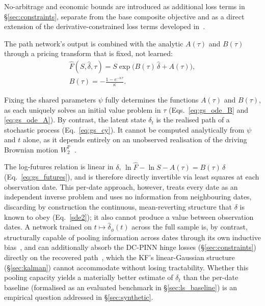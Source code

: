 \documentclass[sigconf, authorversion=true, nonacm=true]{acmart}
\begin{document}
No-arbitrage and economic bounds are introduced as additional loss terms in \S\ref{sec:constraints}, separate from the base composite objective and as a direct extension of the derivative-constrained loss terms developed in~\cite{Hoshisashi2024Physics-InformedPDEs}.

The path network's output is combined with the analytic $A(\tau)$ and
$B(\tau)$ through a pricing transform that is fixed, not learned:
\begin{equation}
    \label{eq:pricing_transform}
    \begin{gathered}
      \hat{F}(S, \hat{\delta}, \tau) = S \exp\!\big(B(\tau)\,\hat{\delta} + A(\tau)\big), \\
      B(\tau) = -\frac{1-e^{-\kappa\tau}}{\kappa}.
    \end{gathered}
\end{equation}

Fixing the shared parameters $\psi$ fully determines the functions $A(\tau)$ and $B(\tau)$, as each uniquely solves an initial value problem in $\tau$ (Eqs.~\ref{eq:gs_ode_B} and \ref{eq:gs_ode_A}). By contrast, the latent state $\delta_t$ is the realised path of a stochastic process (Eq.~\ref{eq:gs_cy}). It cannot be computed analytically from $\psi$ and $t$ alone, as it depends entirely on an unobserved realisation of the driving Brownian motion $W_2^{\mathbb{P}}$~\cite{Schwartz1997TheHedging, duffie2000transform}.

The log-futures relation is linear in $\delta$,
$\ln\hat{F} - \ln S - A(\tau) = B(\tau)\,\delta$ (Eq.~\ref{eq:gs_futures}),
and is therefore directly invertible via least squares at each observation
date. This per-date approach, however, treats every date as an independent
inverse problem and uses no information from neighbouring dates, discarding by
construction the continuous, mean-reverting structure that $\delta$ is known to
obey (Eq.~\ref{sde2}); it also cannot produce a value between observation
dates. A network trained on $t \mapsto \hat\delta_\phi(t)$ across the full
sample is, by contrast, structurally capable of pooling information across
dates through its own inductive bias~\cite{rahaman2019spectral}, and can additionally absorb the DC-PINN
hinge losses (\S\ref{sec:constraints}) directly on the recovered path~\cite{Hoshisashi2024Physics-InformedPDEs},
which the KF's linear-Gaussian structure~\cite{krul2008calibration} (\S\ref{sec:kalman})
cannot accommodate without losing tractability. Whether this pooling capacity
yields a materially better estimate of $\delta_t$ than the per-date baseline
(formalised as an evaluated benchmark in \S\ref{sec:ls_baseline})
is an empirical question addressed in \S\ref{sec:synthetic}.
\end{document}
